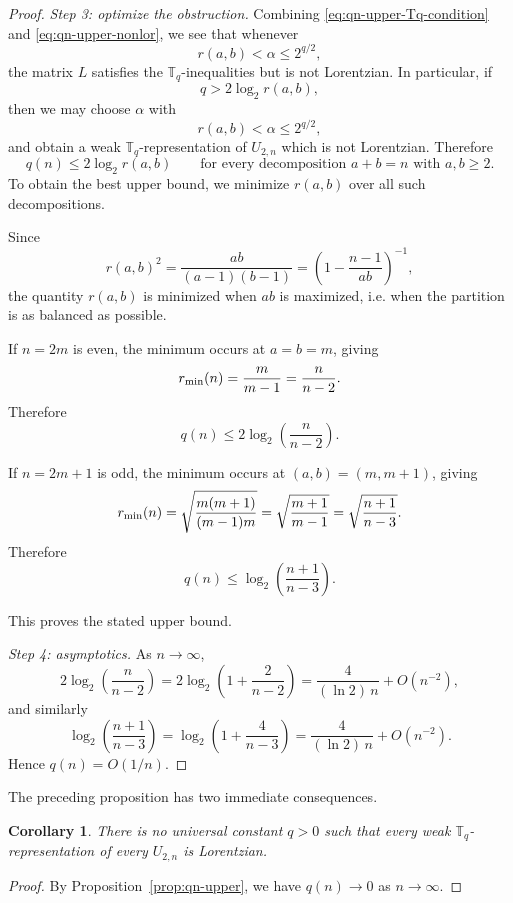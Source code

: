 \documentclass[12pt]{amsart}
\newtheorem{corollary}[theorem]{Corollary}
\theoremstyle{definition}
\newcommand{\1}{\mathbf{1}}
\newcommand\T{{\mathbb T}}
\renewcommand{\min}{\textup{min}}
\newcommand\mb{\texorpdfstring{\textbf{Matt:} }{Matt: }}
\newcommand{\mk}[2][]{\todo[color=orange, #1]{\textbf{Mario}: #2}}
\begin{document}
\begin{proof}
\smallskip

\emph{Step 3: optimize the obstruction.}
Combining \eqref{eq:qn-upper-Tq-condition} and
\eqref{eq:qn-upper-nonlor}, we see that whenever
\[
r(a,b)<\alpha\le 2^{q/2},
\]
the matrix $L$ satisfies the $\T_q$-inequalities but is not Lorentzian.  In
particular, if
\[
q>2\log_2 r(a,b),
\]
then we may choose $\alpha$ with
\[
r(a,b)<\alpha\le 2^{q/2},
\]
and obtain a weak $\T_q$-representation of $U_{2,n}$ which is not Lorentzian.
Therefore
\[
q(n)\le 2\log_2 r(a,b)
\qquad\text{for every decomposition }a+b=n\text{ with }a,b\ge 2.
\]
To obtain the best upper bound, we minimize $r(a,b)$ over all such
decompositions.

Since
\[
r(a,b)^2=\frac{ab}{(a-1)(b-1)}
=\left(1-\frac{n-1}{ab}\right)^{-1},
\]
the quantity $r(a,b)$ is minimized when $ab$ is maximized, i.e. when the
partition is as balanced as possible.

If $n=2m$ is even, the minimum occurs at $a=b=m$, giving
\[
r_{\min}(n)=\frac{m}{m-1}=\frac{n}{n-2}.
\]
Therefore
\[
q(n)\le 2\log_2\!\left(\frac{n}{n-2}\right).
\]

If $n=2m+1$ is odd, the minimum occurs at $(a,b)=(m,m+1)$, giving
\[
r_{\min}(n)=\sqrt{\frac{m(m+1)}{(m-1)m}}
=\sqrt{\frac{m+1}{m-1}}
=\sqrt{\frac{n+1}{n-3}}.
\]
Therefore
\[
q(n)\le \log_2\!\left(\frac{n+1}{n-3}\right).
\]

This proves the stated upper bound.

\smallskip

\emph{Step 4: asymptotics.}
As $n\to\infty$,
\[
2\log_2\!\left(\frac{n}{n-2}\right)
=
2\log_2\!\left(1+\frac{2}{n-2}\right)
=
\frac{4}{(\ln 2)\,n}+O(n^{-2}),
\]
and similarly
\[
\log_2\!\left(\frac{n+1}{n-3}\right)
=
\log_2\!\left(1+\frac{4}{n-3}\right)
=
\frac{4}{(\ln 2)\,n}+O(n^{-2}).
\]
Hence $q(n)=O(1/n)$.
\end{proof}


The preceding proposition has two immediate consequences.

\begin{corollary}
\label{cor:no-universal-q}
There is no universal constant $q>0$ such that every weak $\T_q$-representation of
every $U_{2,n}$ is Lorentzian.
\end{corollary}

\begin{proof}
By Proposition~\ref{prop:qn-upper}, we have $q(n)\to 0$ as $n\to\infty$.
\end{proof}
\end{document}
